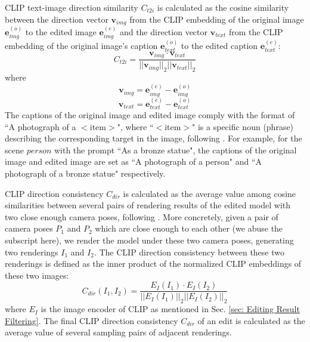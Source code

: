 CLIP text-image direction similarity $C_{t2i}$ is calculated as the cosine similarity between the direction vector $\mathbf{v}_{img}$ from the CLIP embedding of the original image $\mathbf{e}_{img}^{(o)}$ to the edited image $\mathbf{e}_{img}^{(e)}$ and the direction vector $\mathbf{v}_{text}$ from the CLIP embedding of the original image's caption $\mathbf{e}_{text}^{(o)}$ to the edited caption $\mathbf{e}_{text}^{(e)}$:
\begin{equation}
    C_{t2i} = \frac{\mathbf{v}_{img} \cdot \mathbf{v}_{text}}{||\mathbf{v}_{img}||_2||\mathbf{v}_{text}||_2}
\end{equation}
where 
\begin{equation}
    \mathbf{v}_{img} = \mathbf{e}_{img}^{(e)} - \mathbf{e}_{img}^{(o)}
\end{equation}
\begin{equation}
    \mathbf{v}_{text} = \mathbf{e}_{text}^{(e)} - \mathbf{e}_{text}^{(o)}
\end{equation}
The captions of the original image and edited image comply with the format of ``A photograph of a $<$item$>$", where ``$<$item$>$" is a specific noun (phrase) describing the corresponding target in the image, following \cite{haque2023instruct}. For example, for the scene $person$ with the prompt ``As a bronze statue", the captions of the original image and edited image are set as ``A photograph of a person" and ``A photograph of a bronze statue" respectively.

CLIP direction consistency $C_{dir}$ is calculated as the average value among cosine similarities between several pairs of rendering results of the edited model with two close enough camera poses, following \cite{haque2023instruct}. More concretely, given a pair of camera poses $P_1$ and $P_2$ which are close enough to each other (we abuse the subscript here), we render the model under these two camera poses, generating two renderings $I_1$ and $I_2$. The CLIP direction consistency between these two renderings is defined as the inner product of the normalized CLIP embeddings of these two images:
\begin{equation}
    C_{dir}(I_1, I_2) = \frac{E_{I}(I_1) \cdot E_{I}(I_2)}{||E_{I}(I_1)||_2||E_{I}(I_2)||_2}
\end{equation}
where $E_{I}$ is the image encoder of CLIP as mentioned in Sec. \ref{sec: Editing Result Filtering}. The final CLIP direction consistency $C_{dir}$ of an edit is calculated as the average value of several sampling pairs of adjacent renderings.

